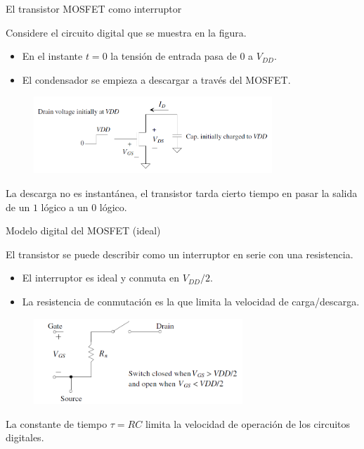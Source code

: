 \documentclass[t,aspectratio=169]{beamer}
\begin{document}
\begin{frame}{El transistor MOSFET como interruptor}

Considere el circuito digital que se muestra en la figura.

\begin{itemize}
    \item En el instante $t=0$ la tensión de entrada pasa de $0$ a $V_{DD}$.
    \item El condensador se empieza a descargar a través del MOSFET.
\end{itemize}

\begin{figure}
    \centering
    \includegraphics[width=0.8\textwidth]{figuras/mosfet_circuito_digital.png}
\end{figure}

La descarga no es instantánea, el transistor tarda cierto tiempo en pasar la salida de un $1$ lógico a un $0$ lógico.

\end{frame}


\begin{frame}{Modelo digital del MOSFET (ideal)}

El transistor se puede describir como un interruptor en serie con una resistencia.

\begin{itemize}
	\item El interruptor es ideal y conmuta en $V_{DD}/2$.
	\item La resistencia de conmutación es la que limita la velocidad de carga/descarga.
\end{itemize}

\begin{figure}
    \centering
    \includegraphics[width=0.7\textwidth]{figuras/mosfet_modelo_digital.png}
\end{figure}

La constante de tiempo $\tau = RC$ limita la velocidad de operación de los circuitos digitales.

\end{frame}
\end{document}

